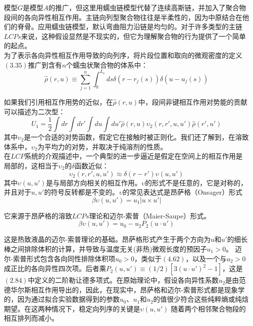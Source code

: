 模型$G$是模型$A$的推广，但这里用蠕虫链模型代替了连续高斯链，并加入了聚合物段间的各向异性相互作用。主链向列型聚合物往往是半柔性的，因为中原结合在他们的脊骨。应用蠕虫链模型，默认弯曲阻力沿链是均匀的。对于许多类型的主链$LCPs$来说，这种假设显然是不现实的，但它为理解聚合物的行为提供了一个简单的起点。\\

为了表示各向异性相互作用导致的向列序，将片段位置和取向的微观密度的定义$(3.35)$推广到含有$n$个蠕虫状聚合物的体系中：\\
\begin{equation}
\hat{\rho}(r,u) \equiv \sum_{j=1}^{n} \int _{0}^{L_{c}} ds \delta(r-r_{j}(s)) \delta (u-u_{j}(s))
\end{equation}

如果我们引用相互作用势的近似，在$\hat{\rho}(r,u)$中，段间非键相互作用对势能的贡献可以描述为二次型：\\
\begin{equation}
U_1=\frac{1}{2} \int dr \int dr' \int du \int du' \hat{\rho}(r,u) \upsilon_2(r,r',u,u') \hat{\rho}(r',u')
\end{equation}
其中$\upsilon_2$是一个合适的对势函数，假定它在接触时被正则化。我们还了解到，在溶致体系中，$\upsilon_2$为平均力的对势，并取决于纯溶剂的性质。\\

在$LCP$系统的介观描述中，一个典型的进一步逼近是假定在空间上的相互作用是局部的，这相当于$\upsilon_2$的$\delta$函数近似：\\
\begin{equation}
\upsilon_{2}(r,r',u,u') \approx \delta(r-r') \upsilon(u,u')
\end{equation}
其中$\upsilon(u,u')$是与局部方向相关的相互作用。$\upsilon$的形式不是任意的，它是对称的，并且对于$u,u'$的符号反转都是不变的。$\upsilon$的常见表达式是昂萨格（Onsager）形式\\
\begin{equation}
\beta \upsilon(u,u')= u_{1}|u\times u'|
\end{equation}

它来源于昂萨格的溶致$LCPs$理论和迈尔-索普（Maier-Saupe）形式。\\
\begin{equation}
\beta \upsilon(u,u')=u_0 - u_{2} P_{2}(u \cdot u')
\end{equation}

这是热致液晶的迈尔-索普理论的基础。昂萨格形式产生于两个方向为$u$和$u'$的细长棒之间排除体积的计算，并导致与温度无关(非热)微观长度的预因子$u_{1}>0$。 迈尔-索普形式包含各向同性排除体积项$u_{0}>0$，类似于$(4.62)$，以及一个与$u_2>0$成正比的各向异性四次项。后者乘$P_{2}(u,u')\equiv (1/2)[3(u\cdot u')^2-1]$，这是$(2.84)$中定义的二阶勒让德多项式。在原始理论中，假设各向异性系数$u_2$是由范德华尔斯相互作用导出的，因此，在现实中，昂萨格和迈尔-索普形式都是现象学的，因为通过拟合实验数据得到的参数$u_0$、$u_1$和$u_2$的值很少符合这些纯粹熵或纯焓期望。在这两种情况下，稳定向列序的关键是$\upsilon (u,u')$ 随着两个相邻聚合物段的相互排列而减小。\\

